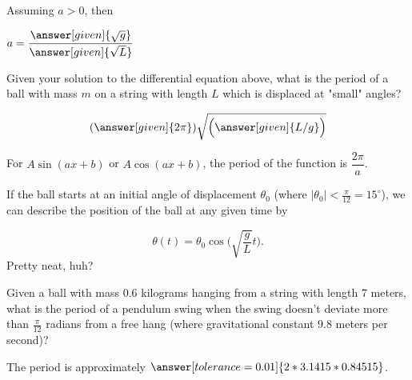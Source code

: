\documentclass[handout,nooutcomes]{ximera}
\begin{document}
\begin{example}
\begin{explanation}
\begin{question}
Assuming $a>0$, then 

\begin{prompt}
$a = \dfrac{\answer[given]{\sqrt{g}}}{\answer[given]{\sqrt{L}}}$
\end{prompt}
\end{question}

\begin{question}
Given your solution to the differential equation above, what is the period of a ball with mass $m$ on a string with length $L$ which is displaced at "small" angles?

\[
(\answer[given]{2\pi})\sqrt{\Big(\answer[given]{L/g}\Big)}
\]
\begin{hint}
For $A\sin(ax+b)$ or $A\cos(ax+b)$, the period of the function is $\dfrac{2\pi}{a}$.
\end{hint}
\end{question}

If the ball starts at an initial angle of displacement $\theta_0$
(where $|\theta_0|<\frac{\pi}{12}= 15^\circ$), we can describe
the position of the ball at any given time by

\[
\theta(t) = \theta_0 \cos\Big(\sqrt{\frac{g}{L}} t\Big).
\]
Pretty neat, huh?

\begin{question}
Given a ball with mass $0.6$ kilograms hanging from a string with length $7$ meters, what is the period of a pendulum swing when the swing doesn't deviate more than $\frac{\pi}{12}$ radians from a free hang (where gravitational constant $9.8$ meters per second)?

\begin{prompt}
The period is approximately $\answer[tolerance=0.01]{2*3.1415*0.84515}$.
\end{prompt}
\end{question}




\end{explanation}
\end{example}
\end{document}
